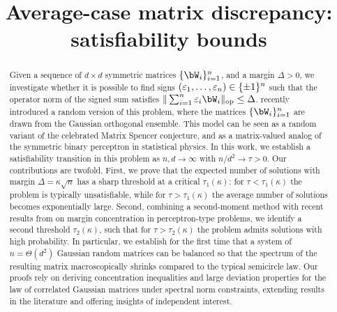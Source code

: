 \documentclass[letterpaper,11pt]{article}
\begin{document}
\title{Average-case matrix discrepancy: satisfiability bounds}
\date{}
\author{}

\maketitle


\vspace{-26pt}

\begin{abstract}
    Given a sequence of $d \times d$ symmetric matrices $\{\bW_i\}_{i=1}^n$, and a margin $\Delta > 0$, we investigate whether it is possible to find signs $(\varepsilon_1, \dots, \varepsilon_n) \in \{\pm 1\}^n$ such that the operator norm of the signed sum satisfies $\|\sum_{i=1}^n \eps_i \bW_i\|_\op \leq \Delta$.
    \cite{kunisky2023online} recently introduced a random version of this problem, where the matrices $\{\bW_i\}_{i=1}^n$ are drawn from the Gaussian orthogonal ensemble. 
    This model can be seen as a random variant of the celebrated Matrix Spencer conjecture, and as a matrix-valued analog of the symmetric binary perceptron in statistical physics.
%
    In this work, we establish a satisfiability transition in this problem as $n, d \to \infty$ with $n / d^2 \to \tau > 0$.
    Our contributions are twofold. 
    First, we prove that the expected number of solutions with margin $\Delta = \kappa \sqrt{n}$ has a sharp threshold at a critical $\tau_1(\kappa)$: 
    for $\tau < \tau_1(\kappa)$ the problem is typically unsatisfiable, while for $\tau > \tau_1(\kappa)$ the average number of solutions becomes exponentially large.
    Second, combining a second-moment method with recent results from \cite{altschuler2023zero} on margin concentration in perceptron-type problems, we identify a second threshold $\tau_2(\kappa)$, 
    such that for $\tau > \tau_2(\kappa)$ the problem admits solutions with high probability.
%
    In particular, we establish for the first time that a system of $n = \Theta(d^2)$ Gaussian random matrices can be balanced so that the spectrum of the resulting matrix macroscopically shrinks compared to the typical semicircle law.
    Our proofs rely on deriving concentration inequalities and large deviation properties for the law of correlated Gaussian matrices under spectral norm constraints, extending results in the literature and offering insights of independent interest.
\end{abstract}
\end{document}
